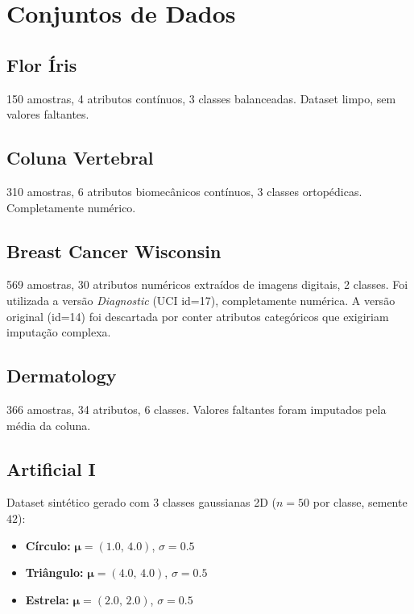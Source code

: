 \documentclass[12pt, a4paper]{article}
\begin{document}
\section{Conjuntos de Dados}

\subsection{Flor Íris}
150 amostras, 4 atributos contínuos, 3 classes balanceadas.
Dataset limpo, sem valores faltantes.

\subsection{Coluna Vertebral}
310 amostras, 6 atributos biomecânicos contínuos, 3 classes
ortopédicas. Completamente numérico.

\subsection{Breast Cancer Wisconsin}
569 amostras, 30 atributos numéricos extraídos de imagens digitais,
2 classes. Foi utilizada a versão \textit{Diagnostic} (UCI id=17),
completamente numérica. A versão original (id=14) foi descartada
por conter atributos categóricos que exigiriam imputação complexa.

\subsection{Dermatology}
366 amostras, 34 atributos, 6 classes. Valores faltantes foram
imputados pela média da coluna.

\subsection{Artificial I}
Dataset sintético gerado com 3 classes gaussianas 2D
($n=50$ por classe, semente $42$):
\begin{itemize}
    \item \textbf{Círculo:} $\boldsymbol{\mu}=(1.0,\,4.0)$, $\sigma=0.5$
    \item \textbf{Triângulo:} $\boldsymbol{\mu}=(4.0,\,4.0)$, $\sigma=0.5$
    \item \textbf{Estrela:} $\boldsymbol{\mu}=(2.0,\,2.0)$, $\sigma=0.5$
\end{itemize}

\end{document}
